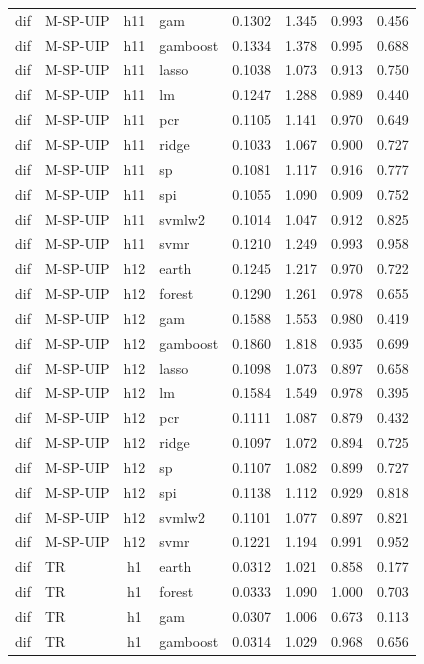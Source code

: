 \begin{ThreePartTable}
\begin{longtable}[t]{llclcccc}
dif & M-SP-UIP & h11 & gam & 0.1302 & 1.345 & 0.993 & 0.456\\
dif & M-SP-UIP & h11 & gamboost & 0.1334 & 1.378 & 0.995 & 0.688\\
dif & M-SP-UIP & h11 & lasso & 0.1038 & 1.073 & 0.913 & 0.750\\
dif & M-SP-UIP & h11 & lm & 0.1247 & 1.288 & 0.989 & 0.440\\
dif & M-SP-UIP & h11 & pcr & 0.1105 & 1.141 & 0.970 & 0.649\\
dif & M-SP-UIP & h11 & ridge & 0.1033 & 1.067 & 0.900 & 0.727\\
dif & M-SP-UIP & h11 & sp & 0.1081 & 1.117 & 0.916 & 0.777\\
dif & M-SP-UIP & h11 & spi & 0.1055 & 1.090 & 0.909 & 0.752\\
dif & M-SP-UIP & h11 & svmlw2 & 0.1014 & 1.047 & 0.912 & 0.825\\
dif & M-SP-UIP & h11 & svmr & 0.1210 & 1.249 & 0.993 & 0.958\\
\addlinespace
dif & M-SP-UIP & h12 & earth & 0.1245 & 1.217 & 0.970 & 0.722\\
dif & M-SP-UIP & h12 & forest & 0.1290 & 1.261 & 0.978 & 0.655\\
dif & M-SP-UIP & h12 & gam & 0.1588 & 1.553 & 0.980 & 0.419\\
dif & M-SP-UIP & h12 & gamboost & 0.1860 & 1.818 & 0.935 & 0.699\\
dif & M-SP-UIP & h12 & lasso & 0.1098 & 1.073 & 0.897 & 0.658\\
dif & M-SP-UIP & h12 & lm & 0.1584 & 1.549 & 0.978 & 0.395\\
dif & M-SP-UIP & h12 & pcr & 0.1111 & 1.087 & 0.879 & 0.432\\
dif & M-SP-UIP & h12 & ridge & 0.1097 & 1.072 & 0.894 & 0.725\\
dif & M-SP-UIP & h12 & sp & 0.1107 & 1.082 & 0.899 & 0.727\\
dif & M-SP-UIP & h12 & spi & 0.1138 & 1.112 & 0.929 & 0.818\\
dif & M-SP-UIP & h12 & svmlw2 & 0.1101 & 1.077 & 0.897 & 0.821\\
dif & M-SP-UIP & h12 & svmr & 0.1221 & 1.194 & 0.991 & 0.952\\
\addlinespace
dif & TR & h1 & earth & 0.0312 & 1.021 & 0.858 & 0.177\\
dif & TR & h1 & forest & 0.0333 & 1.090 & 1.000 & 0.703\\
dif & TR & h1 & gam & 0.0307 & 1.006 & 0.673 & 0.113\\
dif & TR & h1 & gamboost & 0.0314 & 1.029 & 0.968 & 0.656\\

\end{longtable}
\end{ThreePartTable}
